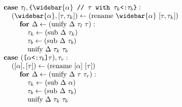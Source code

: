 \documentclass[acmsmall]{acmart}
\begin{document}
\begin{figure*}[h]
\[\begin{array}[t]{@{} l}
    \\

    \I \B{case } \tau_l, \code{\{$\widebar{\alpha}$ // $\tau$ with $\tau_k$<:$\tau_b$\}} : 
    \\
    \I\I (\widebar{\alpha}, [\tau, \tau_k]) \leftarrow (\F{rename } \widebar{\alpha}\ [\tau, \tau_k])
    \\
    \I\I\I \B{for } \Delta \leftarrow (\F{unify } \Delta\ \tau_l\ \tau):
    \\
    \I\I\I\I \tau_k \leftarrow (\F{sub } \Delta\ \tau_k)
    \\
    \I\I\I\I \tau_b \leftarrow (\F{sub } \Delta\ \tau_b)
    \\
    \I\I\I\I \F{unify } \Delta\ \tau_k\ \tau_b

    \\

    \I \B{case } (\code{[$\alpha$<:$\tau_b$]$\tau$}), \tau_r : 
    \\
    \I\I ([\alpha], [\tau]) \leftarrow (\F{rename } [\alpha]\ [\tau])
    \\
    \I\I\I \B{for } \Delta \leftarrow (\F{unify } \Delta\ \tau\ \tau_r):
    \\
    \I\I\I\I \tau_k \leftarrow (\F{sub } \Delta\ \alpha)
    \\
    \I\I\I\I \tau_b \leftarrow (\F{sub } \Delta\ \tau_b)
    \\
    \I\I\I\I \F{unify } \Delta\ \tau_k\ \tau_b




\end{array}\]
\end{figure*}
\end{document}
